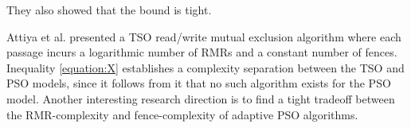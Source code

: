 \noindent They also showed that the bound is tight.

Attiya et al. \cite{DBLP:conf/podc/AttiyaHL13} presented a TSO read/write mutual exclusion algorithm where each passage incurs a logarithmic number of RMRs and a constant number of fences. Inequality \ref{equation:X} establishes a complexity separation between the TSO and PSO models, since it follows from it that no such algorithm exists for the PSO model. Another interesting research direction is to find a tight tradeoff between the RMR-complexity and fence-complexity of adaptive PSO algorithms.
